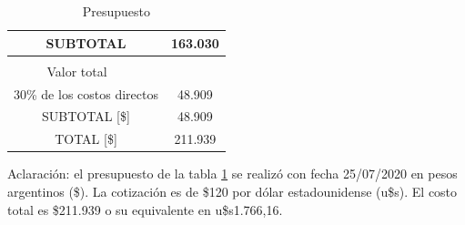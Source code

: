 \documentclass[11pt]{charter}
\begin{document}
\begin{table}[htpb]
{\begin{tabularx}{\linewidth}{@{}|p{1em}|X|X|X|X|@{}}
\multicolumn{4}{|c|}{SUBTOTAL} &
  \multicolumn{1}{c|}{163.030} \\ \hline
\rowcolor[HTML]{C0C0C0} 
\multicolumn{5}{|c|}{\cellcolor[HTML]{CCFFFF}COSTOS INDIRECTOS [\$]} \\ \hline
\rowcolor[HTML]{C0C0C0} 
\multicolumn{4}{|c|}{Descripción} &
  \multicolumn{1}{c|}{\cellcolor[HTML]{B0B0B0}Valor total} \\ \hline
\multicolumn{4}{|c|}{30\% de los costos directos} &
  \multicolumn{1}{c|}{48.909} \\ \hline
  
\multicolumn{4}{|c|}{SUBTOTAL [\$]} &
  \multicolumn{1}{c|}{48.909} \\ \hline
\multicolumn{4}{|c|}{\cellcolor[HTML]{B0B0B0}TOTAL [\$]} &
  \multicolumn{1}{c|}{\cellcolor[HTML]{B0B0B0}211.939} \\ \hline   
\end{tabularx}
}
\caption{Presupuesto}
\label{tab:Presupuesto}
\end{table}


Aclaración: el presupuesto de la tabla \ref{tab:Presupuesto} se realizó con fecha 25/07/2020 en pesos argentinos (\$). La  cotización es de \$120 por dólar estadounidense (u\$s). El costo total es \$211.939 o su equivalente en u\$s1.766,16.

\vspace{40em}
\end{document}

